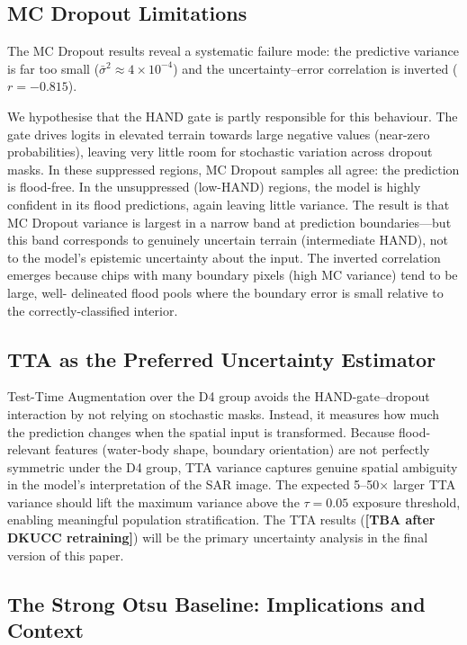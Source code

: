 \documentclass[12pt]{article}
\newcommand{\tbatxt}{\colorbox{pending}{\textbf{[TBA after DKUCC retraining]}}}
\begin{document}
\subsection{MC Dropout Limitations}
\label{sec:mc_limitations}

The MC Dropout results reveal a systematic failure mode: the predictive
variance is far too small ($\bar{\sigma}^2 \approx 4 \times 10^{-4}$)
and the uncertainty–error correlation is inverted ($r = -0.815$).

We hypothesise that the HAND gate is partly responsible for this behaviour.
The gate drives logits in elevated terrain towards large negative values
(near-zero probabilities), leaving very little room for stochastic variation
across dropout masks.  In these suppressed regions, MC Dropout samples all
agree: the prediction is flood-free.  In the unsuppressed (low-HAND) regions,
the model is highly confident in its flood predictions, again leaving little
variance.  The result is that MC Dropout variance is largest in a narrow
band at prediction boundaries—but this band corresponds to genuinely
uncertain terrain (intermediate HAND), not to the model's epistemic
uncertainty about the input.  The inverted correlation emerges because
chips with many boundary pixels (high MC variance) tend to be large, well-
delineated flood pools where the boundary error is small relative to the
correctly-classified interior.

\subsection{TTA as the Preferred Uncertainty Estimator}

Test-Time Augmentation over the D4 group avoids the HAND-gate–dropout
interaction by not relying on stochastic masks.  Instead, it measures how
much the prediction changes when the spatial input is transformed.  Because
flood-relevant features (water-body shape, boundary orientation) are not
perfectly symmetric under the D4 group, TTA variance captures genuine
spatial ambiguity in the model's interpretation of the SAR image.  The
expected 5–50$\times$ larger TTA variance should lift the maximum variance
above the $\tau=0.05$ exposure threshold, enabling meaningful population
stratification.  The TTA results (\tbatxt) will be the primary uncertainty
analysis in the final version of this paper.

\subsection{The Strong Otsu Baseline: Implications and Context}
\end{document}
